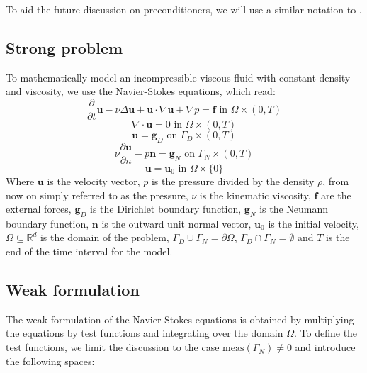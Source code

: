 To aid the future discussion on preconditioners, we will use a similar notation to \cite{Quarteroni}.

\subsection{Strong problem}
To mathematically model an incompressible viscous fluid with constant density and viscosity, we use the Navier-Stokes equations, which read:
\begin{equation}
\frac{\partial}{\partial t} \mathbf{u} - \nu \Delta \mathbf{u} + \mathbf{u} \cdot \nabla \mathbf{u} + \nabla p = \mathbf{f} \text{ in } \Omega \times (0, T)
\end{equation}
\begin{equation}
\nabla \cdot \mathbf{u} = 0 \text{ in } \Omega \times (0, T)
\end{equation}
\begin{equation}
\mathbf{u} = \mathbf{g}_D \text{ on } \Gamma_D \times (0, T)
\end{equation}
\begin{equation}
\nu \frac{\partial \mathbf{u}}{\partial n} - p \mathbf{n} = \mathbf{g}_N \text{ on } \Gamma_N\times (0, T)
\end{equation}
\begin{equation}
\mathbf{u} = \mathbf{u}_0 \text{ in } \Omega \times \{0\}
\end{equation}
Where $\mathbf{u}$ is the velocity vector, $p$ is the pressure divided by the density $\rho$, from now on simply referred to as the pressure, $\nu$ is the kinematic viscosity, $\mathbf{f}$ are the external forces, $\mathbf{g}_D$ is the Dirichlet boundary function, $\mathbf{g}_N$ is the Neumann boundary function, $\mathbf{n}$ is the outward unit normal vector, $\mathbf{u}_0$ is the initial velocity, $\Omega \subseteq \mathbb{R}^d$ is the domain of the problem, $\Gamma_D \cup \Gamma_N = \partial\Omega$, $\Gamma_D \cap \Gamma_N = \emptyset$ and $T$ is the end of the time interval for the model.

\subsection{Weak formulation}
The weak formulation of the Navier-Stokes equations is obtained by multiplying the equations by test functions and integrating over the domain $\Omega$.
To define the test functions, we limit the discussion to the case $\text{meas}(\Gamma_N) \neq 0$ and introduce the following spaces:

